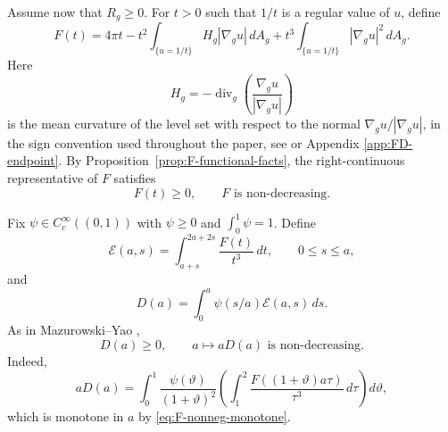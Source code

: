 \documentclass[11pt]{amsart}
\numberwithin{equation}{section}
\theoremstyle{definition}
\newcommand{\Efun}{\mathcal E}
\newcommand{\abs}[1]{\left\lvert #1\right\rvert}
\begin{document}
Assume now that $R_g\ge0$.  For $t>0$ such that $1/t$ is a regular value of $u$, define
\begin{equation}\label{eq:F-def}
        F(t)=4\pi t-t^2\int_{\{u=1/t\}}H_g\abs{\nabla_g u}\,dA_g
        +t^3\int_{\{u=1/t\}}\abs{\nabla_g u}^2\,dA_g.
\end{equation}
Here
$$
        H_g=-\operatorname{div}_g\left(\frac{\nabla_g u}{|\nabla_g u|}\right)
$$
is the mean curvature of the level set with respect to the normal $\nabla_g u/|\nabla_g u|$, in the sign convention used throughout the paper, see \cite{AMO} or Appendix \ref{app:FD-endpoint}. By Proposition~\ref{prop:F-functional-facts}, the right-continuous representative of $F$ satisfies
\begin{equation}\label{eq:F-nonneg-monotone}
        F(t)\ge0,
        \qquad F\text{ is non-decreasing.}
\end{equation}

Fix $\psi\in C_c^\infty((0,1))$ with $\psi\ge0$ and $\int_0^1\psi=1$.  Define
\begin{equation}\label{eq:E-def}
        \Efun(a,s)=\int_{a+s}^{2a+2s}\frac{F(t)}{t^3}\,dt,
        \qquad 0\le s\le a,
\end{equation}
and
\begin{equation}\label{eq:D-def}
        D(a)=\int_0^a\psi(s/a)\Efun(a,s)\,ds.
\end{equation}
As in Mazurowski--Yao \cite[Propositions~14 and~15]{MYrigidity},
\begin{equation}\label{eq:D-positive-monotone}
        D(a)\ge0,
        \qquad a\mapsto aD(a)\text{ is non-decreasing}.
\end{equation}
Indeed,
$$
        aD(a)=\int_0^1\frac{\psi(\vartheta)}{(1+\vartheta)^2}
        \left(\int_1^2\frac{F((1+\vartheta)a\tau)}{\tau^3}\,d\tau\right)d\vartheta,
$$
which is monotone in $a$ by \eqref{eq:F-nonneg-monotone}.
\end{document}
